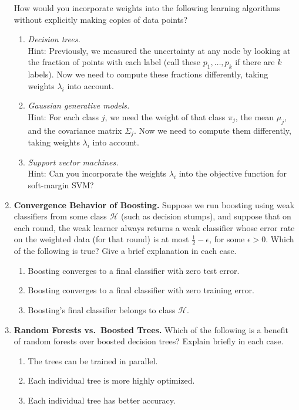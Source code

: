 \documentclass[11pt]{article}
\begin{document}
\begin{enumerate}
  How would you incorporate weights into the following learning algorithms without explicitly making copies of data points?
    \begin{enumerate}
      \item \emph{Decision trees.}\\
      Hint: Previously, we measured the uncertainty at any node by looking at the fraction of points with each label (call these $p_1,\dots,p_k$ if there are $k$ labels). Now we need to compute these fractions differently, taking weights $\lambda_i$ into account.

      \item \emph{Gaussian generative models.}\\
      Hint: For each class $j$, we need the weight of that class $\pi_j$, the mean $\mu_j$, and the covariance matrix $\Sigma_j$. Now we need to compute them differently, taking weights $\lambda_i$ into account.

      \item \emph{Support vector machines.}\\
      Hint: Can you incorporate the weights $\lambda_i$ into the objective function for soft-margin SVM?
    \end{enumerate}

  \item \textbf{Convergence Behavior of Boosting.} Suppose we run boosting using weak classifiers from some class $\mathcal H$ (such as decision stumps), and suppose that on each round, the weak learner always returns a weak classifier whose error rate on the weighted data (for that round) is at most $\tfrac12 - \epsilon$, for some $\epsilon>0$. Which of the following is true? Give a brief explanation in each case.
    \begin{enumerate}
      \item Boosting converges to a final classifier with zero test error.
      \item Boosting converges to a final classifier with zero training error.
      \item Boosting's final classifier belongs to class $\mathcal H$.
    \end{enumerate}

  \item \textbf{Random Forests vs.\ Boosted Trees.} Which of the following is a benefit of random forests over boosted decision trees? Explain briefly in each case.
    \begin{enumerate}
      \item The trees can be trained in parallel.
      \item Each individual tree is more highly optimized.
      \item Each individual tree has better accuracy.
    \end{enumerate}
\end{enumerate}
\end{document}
